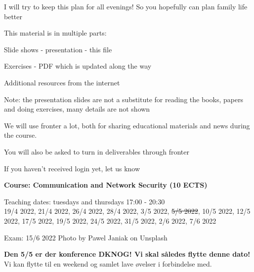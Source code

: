 \documentclass[Screen16to9,17pt]{foils}
\begin{document}
\centerline{I will try to keep this plan for all evenings! So you hopefully can plan family life better}



\begin{list1}
\item This material is in multiple parts:

\item Slide shows - presentation - this file
\item Exercises - PDF which is updated along the way

\item Additional resources from the internet

\end{list1}

{\Large Note: the presentation slides are not a substitute for reading the books, papers and doing exercises, many details are not shown}



We will use fronter a lot, both for sharing educational materials and news during the course.

You will also be asked to turn in deliverables through fronter


\vskip 5mm
\centerline{If you haven't received login yet, let us know}






{\bf Course: Communication and Network Security (10 ECTS)}

Teaching dates: tuesdays and thursdays 17:00 - 20:30\\
19/4 2022, 21/4 2022, 26/4 2022, 28/4 2022, 3/5 2022, \sout{5/5 2022}, 10/5 2022, 12/5 2022, 17/5 2022, 19/5 2022, 24/5 2022, 31/5 2022, 2/6 2022, 7/6 2022

Exam: 15/6 2022 \hskip 12cm Photo by Pawel Janiak on Unsplash

{\small{\bf Den 5/5 er der konference DKNOG! Vi skal således flytte denne dato!}
Vi kan flytte til en weekend og samlet lave øvelser i forbindelse med.}

\end{document}
